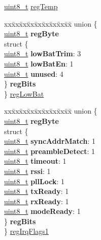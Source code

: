 \begin{DoxyCompactItemize}
\begin{tabbing}
\end{tabbing}\item 
\hyperlink{vl53l0x__types_8h_aba7bc1797add20fe3efdf37ced1182c5}{uint8\+\_\+t} \hyperlink{structFSK__Register__Map_abc6e3c39ab7c42dc2d404f96c706d3a0}{reg\+Temp}
\item 
\begin{tabbing}
xx\=xx\=xx\=xx\=xx\=xx\=xx\=xx\=xx\=\kill
union \{\\
\>\hyperlink{vl53l0x__types_8h_aba7bc1797add20fe3efdf37ced1182c5}{uint8\_t} {\bfseries regByte}\\
\>struct \{\\
\>\>\hyperlink{vl53l0x__types_8h_aba7bc1797add20fe3efdf37ced1182c5}{uint8\_t} {\bfseries lowBatTrim}: 3\\
\>\>\hyperlink{vl53l0x__types_8h_aba7bc1797add20fe3efdf37ced1182c5}{uint8\_t} {\bfseries lowBatEn}: 1\\
\>\>\hyperlink{vl53l0x__types_8h_aba7bc1797add20fe3efdf37ced1182c5}{uint8\_t} {\bfseries unused}: 4\\
\>\} {\bfseries regBits}\\
\} \hyperlink{structFSK__Register__Map_a275098e1838c38f4bad687b94880fcb6}{regLowBat}\\

\end{tabbing}\item 
\begin{tabbing}
xx\=xx\=xx\=xx\=xx\=xx\=xx\=xx\=xx\=\kill
union \{\\
\>\hyperlink{vl53l0x__types_8h_aba7bc1797add20fe3efdf37ced1182c5}{uint8\_t} {\bfseries regByte}\\
\>struct \{\\
\>\>\hyperlink{vl53l0x__types_8h_aba7bc1797add20fe3efdf37ced1182c5}{uint8\_t} {\bfseries syncAddrMatch}: 1\\
\>\>\hyperlink{vl53l0x__types_8h_aba7bc1797add20fe3efdf37ced1182c5}{uint8\_t} {\bfseries preambleDetect}: 1\\
\>\>\hyperlink{vl53l0x__types_8h_aba7bc1797add20fe3efdf37ced1182c5}{uint8\_t} {\bfseries timeout}: 1\\
\>\>\hyperlink{vl53l0x__types_8h_aba7bc1797add20fe3efdf37ced1182c5}{uint8\_t} {\bfseries rssi}: 1\\
\>\>\hyperlink{vl53l0x__types_8h_aba7bc1797add20fe3efdf37ced1182c5}{uint8\_t} {\bfseries pllLock}: 1\\
\>\>\hyperlink{vl53l0x__types_8h_aba7bc1797add20fe3efdf37ced1182c5}{uint8\_t} {\bfseries txReady}: 1\\
\>\>\hyperlink{vl53l0x__types_8h_aba7bc1797add20fe3efdf37ced1182c5}{uint8\_t} {\bfseries rxReady}: 1\\
\>\>\hyperlink{vl53l0x__types_8h_aba7bc1797add20fe3efdf37ced1182c5}{uint8\_t} {\bfseries modeReady}: 1\\
\>\} {\bfseries regBits}\\
\} \hyperlink{structFSK__Register__Map_abd981f959606f160c398fbcde8b2d2f7}{regIrqFlags1}\\


\end{tabbing}
\end{DoxyCompactItemize}
